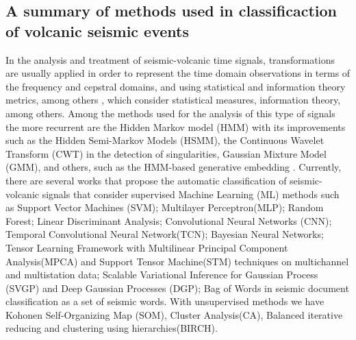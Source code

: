 \documentclass[journal]{IEEEtran}
\begin{document}
\subsection{A summary of methods used in classificaction of volcanic seismic events}
In the analysis and treatment of seismic-volcanic time signals, transformations are usually applied in order to represent the time domain observations in terms of the frequency and cepstral domains, and using statistical and information theory metrics, among others \cite{malfante2018automatic,lara2020automatic}, which consider statistical measures, information theory, among others. Among the methods used for the analysis of this type of signals the more recurrent are the Hidden Markov model (HMM)\cite{bicego2012classification,beyreuther2012constructing, carniel2014characterization} with its improvements such as the Hidden Semi-Markov Models (HSMM), the Continuous Wavelet Transform (CWT)\cite{beyreuther2012constructing} in the detection of singularities, Gaussian Mixture Model (GMM)\cite{langer2009synopsis}, and others, such as the HMM-based generative embedding \cite{bicego2012classification}.
Currently, there are several works that propose the automatic classification of seismic-volcanic signals that consider supervised Machine Learning (ML) methods such as Support Vector Machines (SVM)\cite{malfante2018automatic,curilem2016pattern,giacco2009support,langer2009synopsis,lara2020automatic,curilem2018improving,malfante2018machine}; Multilayer Perceptron(MLP)\cite{giacco2009support,langer2009synopsis,lara2020automatic}; Random Forest\cite{malfante2018automatic,lara2020automatic,titos2019classification}; Linear Discriminant Analysis\cite{lara2020automatic}; Convolutional Neural Networks (CNN)\cite{titos2019classification,salazar2020deep,curilem2018using}; Temporal Convolutional Neural Network(TCN)\cite{titos2019classification,rodriguez2021bayesian}; Bayesian Neural Networks\cite{bueno2019volcano}; Tensor Learning Framework with Multilinear Principal Component Analysis(MPCA) and Support Tensor Machine(STM)\cite{peixoto2021tensor} techniques on multichannel and multistation data; Scalable Variational Inference for Gaussian Process (SVGP) and Deep Gaussian Processes (DGP)\cite{lopez2020acontribution}; Bag of Words in seismic document classification as a set of seismic words\cite{bicego2015volcano}.
With unsupervised methods we have Kohonen Self-Organizing Map (SOM)\cite{langer2009synopsis,esposito2008unsupervised}, Cluster Analysis(CA)\cite{langer2009synopsis}, Balanced iterative reducing and clustering using hierarchies(BIRCH)\cite{duque2020exploring}.
\end{document}
